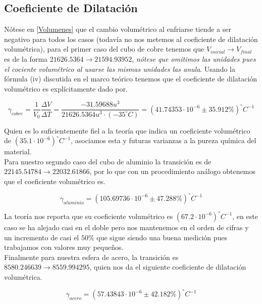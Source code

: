 \documentclass{article}
\begin{document}
\subsection{Coeficiente de Dilatación}

Nótese en \ref{Volumenes} que el cambio volumétrico al enfriarse tiende a ser negativo para todos los casos (todavía no nos metemos al coeficiente de dilatación volumétrica), para el primer caso del cubo de cobre tenemos que $V_{inicial} \rightarrow V_{final}$ es de la forma $21626.5364 \rightarrow 21594.93952$, \textit{nótese que omitimos las unidades pues el cociente volumétrico al usarse las mismas unidades las anula}. Usando la fórmula (iv) discutida en el marco teórico tenemos que el coeficiente de dilatación volumétrico es explícitamente dado por.

\begin{equation}
    \gamma_{cobre} = \frac{1}{V_{0}}\frac{\Delta V}{ \Delta T} = \frac{-31.59688u^3}{21626.5364u^3 \cdot (-35^{\circ}C) } = (41.74353 \cdot 10^{-6} \pm 35.912 \%) ^{\circ}C^{-1}
\end{equation}

Quien es lo suficientemente fiel a la teoría que indica un coeficiente volumétrico de $(35.1 \cdot 10^{-6})^{\circ}C^{-1}$, asociamos esta y futuras varianzas a la pureza química del material.\\

Para nuestro segundo caso del cubo de aluminio la transición es de $22145.54784 \rightarrow 22032.61866$, por lo que con un procedimiento análogo obtenemos que el coeficiente volumétrico es.

\begin{equation}
    \gamma_{aluminio} = (105.69736 \cdot 10^{-6} \pm 47.288 \%) ^{\circ}C^{-1}
\end{equation}

La teoría nos reporta que su coeficiente volumétrico es $(67.2 \cdot 10^{-6})^{\circ}C^{-1}$, en este caso se ha alejado casi en el doble pero nos mantenemos en el orden de cifras y un incremento de casi el $50\%$ que sigue siendo una buena medición pues trabajamos con valores muy pequeños.\\

Finalmente para nuestra esfera de acero, la transición es $8580.246639 \rightarrow 8559.994295$, quien nos da el siguiente coeficiente de dilatación volumétrica.

\begin{equation}
    \gamma_{acero} = (57.43843 \cdot 10^{-6} \pm 42.182 \%) ^{\circ}C^{-1}
\end{equation}
\end{document}
